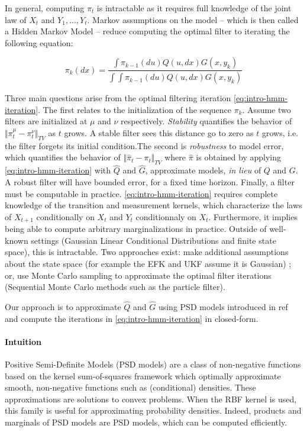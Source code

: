 In general, computing $\pi_t$ is intractable as it requires full knowledge of the joint law of $X_t$  and $Y_1, \ldots, Y_t$. Markov assumptions on the model -- which is then called a Hidden Markov Model -- reduce computing the optimal filter to iterating the following equation:

\begin{equation}\label{eq:intro-hmm-iteration}
\pi_k(dx) = \frac{\int \pi_{k-1}(du)Q(u, dx)G(x, y_k)}{\int \int \pi_{k-1}(du)Q(u, dx)G(x, y_k)}
\end{equation}

Three main questions arise from the optimal filtering iteration \cref{eq:intro-hmm-iteration}. The first relates to the initialization of the sequence $\pi_k$. Assume two filters are initialized at $\mu$ and $\nu$ respectively. \emph{Stability} quantifies the behavior of $\Vert \pi_t^\mu - \pi_t^\nu \Vert_{TV}$ as $t$ grows. A stable filter sees this distance go to zero as $t$ grows, i.e. the filter forgets its initial condition.The second is \emph{robustness} to model error, which quantifies the behavior of $\Vert \hat\pi_t - \pi_t\Vert_{TV}$ where $\hat \pi$ is obtained by applying \cref{eq:intro-hmm-iteration} with $\hat Q$ and $\hat G$, approximate models, \emph{in lieu} of $Q$ and $G$. A robust filter will have bounded error, for a fixed time horizon. Finally, a filter must be computable in practice. \cref{eq:intro-hmm-iteration} requires complete knowledge of the transition and measurement kernels, which characterize the laws of $X_{t+1}$ conditionally on $X_t$ and $Y_t$ conditionnaly on $X_t$. Furthermore, it implies being able to compute arbitrary marginalizations in practice. Outside of well-known settings (Gaussian Linear Conditional Distributions and finite state space), this is intractable. Two approaches exist: make additional assumptions about the state space (for example the EFK and UKF assume it is Gaussian) ; or, use Monte Carlo sampling to approximate the optimal filter iterations (Sequential Monte Carlo methods such as the particle filter).

Our approach is to approximate $\hat Q$ and $\hat G$ using PSD models introduced in ref and compute the iterations in \cref{eq:intro-hmm-iteration} in closed-form.

\paragraph{Intuition}
Positive Semi-Definite Models (PSD models) are a class of non-negative functions based on the kernel sum-of-squares framework which optimally approximate smooth, non-negative functions such as (conditional) densities. These approximations are solutions to convex problems. When the RBF kernel is used, this family is useful for approximating probability densities. Indeed, products and marginals of PSD models are PSD models, which can be computed efficiently.

